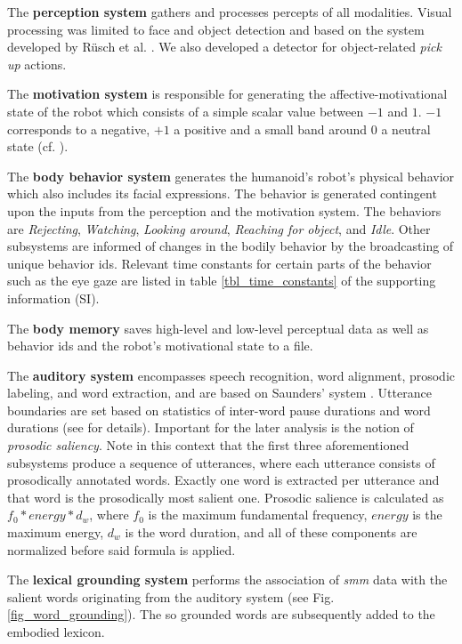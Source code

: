 The \textbf{perception system} gathers and processes percepts of all modalities. Visual processing  was limited to face and object detection and based on
the system developed by R\"{u}sch et al. \cite{Ruesch2008}. We also developed a detector for object-related \emph{pick up} actions.

The \textbf{motivation system} is responsible for generating the affective-motivational state of the robot which consists of a simple scalar value between $-1$ and $1$.
$-1$ corresponds to a negative, $+1$ a positive and a small band around $0$ a neutral state (cf. \cite[Chapter 6]{Varela1991}).

The \textbf{body behavior system} generates the humanoid's robot's physical behavior which also includes its facial expressions. The behavior is generated contingent
upon the inputs from the perception and the motivation system. The behaviors are \emph{Rejecting}, \emph{Watching}, \emph{Looking around}, \emph{Reaching for object},
and \emph{Idle}. Other subsystems are informed of changes in the bodily behavior by the broadcasting of unique behavior ids.
Relevant time constants for certain parts of the behavior such as the eye gaze are listed in table \ref{tbl_time_constants} of the supporting information (SI).

The \textbf{body memory} saves high-level and low-level perceptual data as well as behavior ids and the robot's motivational state to a file.
\label{body_memory}

The \textbf{auditory system} encompasses speech recognition, word alignment, prosodic labeling, and word extraction, and are based on Saunders' system
\cite{Saunders2011}. Utterance boundaries are set based on statistics of inter-word pause durations and word durations (see \cite{Saunders2011} for details).
Important for the later analysis is the notion of \emph{prosodic saliency}. Note in this context that the first three aforementioned subsystems produce
a sequence of utterances, where each utterance consists of prosodically annotated words.
Exactly one word is extracted per utterance and that word is the prosodically most salient one. Prosodic salience is calculated
as $f_0 * energy * d_w$, where $f_0$ is the maximum fundamental frequency, $energy$ is the maximum energy, $d_w$ is the word duration, and all of these
components are normalized before said formula is applied.

The \textbf{lexical grounding system} performs the association of \emph{smm} data with the salient words originating from the auditory system
(see Fig. \ref{fig_word_grounding}). The so grounded words are subsequently added to the embodied lexicon.

